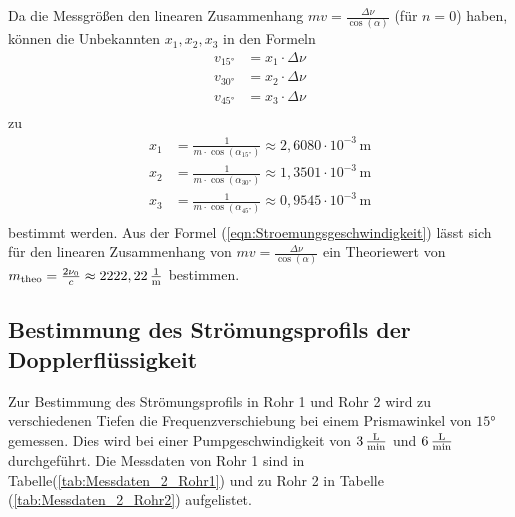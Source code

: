 Da die Messgrößen den linearen Zusammenhang $mv = \frac{\Delta \nu}{\cos(\alpha)}$ (für $n = 0$) haben, können die Unbekannten $x_1, x_2, x_3$ in den Formeln
\begin{align*}
    v_{15°} &= x_1 \cdot \Delta \nu \\
    v_{30°} &= x_2 \cdot \Delta \nu \\
    v_{45°} &= x_3 \cdot \Delta \nu \\
\end{align*}
zu 
\begin{align*}
    x_1 &= \frac{1}{m \cdot \cos(\alpha_{15°})} \approx 2,6080 \cdot 10^{-3}\, \unit{\meter}\\
    x_2 &= \frac{1}{m \cdot \cos(\alpha_{30°})} \approx 1,3501 \cdot 10^{-3}\, \unit{\meter}\\
    x_3 &= \frac{1}{m \cdot \cos(\alpha_{45°})} \approx 0,9545 \cdot 10^{-3}\, \unit{\meter}\\
\end{align*}
bestimmt werden. Aus der Formel (\ref{eqn:Stroemungsgeschwindigkeit}) lässt sich für den linearen Zusammenhang von $mv = \frac{\Delta \nu}{\cos(\alpha)}$ ein 
Theoriewert von $m_{\text{theo}} = \frac{2\nu_0}{c} \approx 2222,22 \, \unit[per-mode=fraction]{\per\meter}$ bestimmen.



\subsection{Bestimmung des Strömungsprofils der Dopplerflüssigkeit}
Zur Bestimmung des Strömungsprofils in Rohr 1 und Rohr 2 wird zu verschiedenen Tiefen die Frequenzverschiebung bei einem Prismawinkel von $15°$ gemessen. 
Dies wird bei einer Pumpgeschwindigkeit von $3 \, \unit[per-mode=fraction]{\liter\per\minute}$ und $6 \, \unit[per-mode=fraction]{\liter\per\minute}$ durchgeführt. 
Die Messdaten von Rohr 1 sind in Tabelle(\ref{tab:Messdaten_2_Rohr1}) und zu Rohr 2 in Tabelle (\ref{tab:Messdaten_2_Rohr2}) aufgelistet. 

